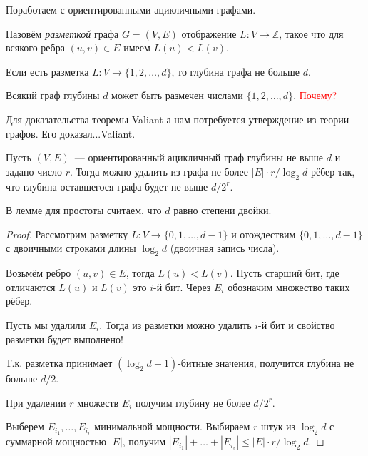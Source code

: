 \documentclass[handout]{beamer}
\renewcommand\le{\leqslant}
\begin{document}
\begin{frame}
    Поработаем с ориентированными ацикличными графами.
    \pause\vspace{5pt}
    
    Назовём \textit{разметкой} графа $G=(V,E)$ отображение $L\colon V\to\mathbb
    Z$, такое что для всякого ребра $(u, v)\in E$ имеем $L(u) < L(v)$.
    \pause\vspace{5pt}

    Если есть разметка $L\colon V\to\{1,2,\ldots,d\}$, то глубина графа не
    больше $d$.
    \pause\vspace{5pt}

    Всякий граф глубины $d$ может быть размечен числами $\{1,2,\ldots,d\}$.
    \textcolor{red}{Почему?}
\end{frame}


\begin{frame}
    Для доказательства теоремы Valiant-а нам потребуется утверждение из теории
    графов. Его доказал...\pause Valiant.\pause

    \begin{lemma}
        Пусть $(V,E)$~--- ориентированный ацикличный граф глубины не выше $d$ и
        задано число $r$.
        Тогда можно удалить из графа не более
        $|E|\cdot r/\log_2 d$
        рёбер так, что глубина оставшегося графа будет не выше $d/2^r$.
    \end{lemma}
    В лемме для простоты считаем, что $d$ равно степени двойки.
\end{frame}
    
    \begin{frame}
    \begin{proof}
        Рассмотрим разметку $L\colon V\to\{0,1,\ldots,d-1\}$ и отождествим
        $\{0,1,\ldots,d-1\}$ с двоичными строками длины $\log_2d$ (двоичная
        запись числа).
        \pause\vspace{5pt}

        Возьмём ребро $(u,v)\in E$, тогда $L(u)<L(v)$.
        Пусть старший бит, где отличаются $L(u)$ и $L(v)$ это $i$-й бит.
        Через $E_i$ обозначим множество таких рёбер.
        \pause\vspace{5pt}

        Пусть мы удалили $E_i$. Тогда из разметки можно удалить $i$-й бит и
        свойство разметки будет выполнено!
        \pause\vspace{5pt}
        
        Т.к. разметка принимает $(\log_2d-1)$-битные значения, получится глубина
        не больше $d/2$.
        \pause\vspace{5pt}

        При удалении $r$ множеств $E_i$ получим глубину не более $d/2^r$.
        \pause\vspace{5pt}

        Выберем $E_{i_1},\ldots,E_{i_r}$ минимальной мощности. Выбираем $r$
        штук из $\log_2d$ с суммарной мощностью $|E|$, получим
        $|E_{i_1}|+\ldots+|E_{i_s}|\le |E|\cdot r/\log_2 d$.
    
    \end{proof}

\end{frame}
\end{document}
